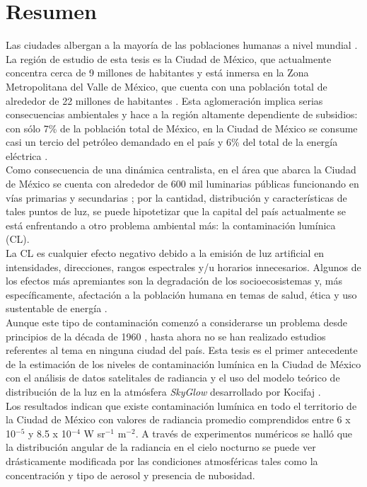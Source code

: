 \chapter{Resumen}

Las ciudades albergan a la mayoría de las poblaciones humanas a nivel mundial \citep{Zari2018}. La región de estudio de esta tesis es la Ciudad de México, que actualmente concentra cerca de 9 millones de habitantes \citep{INEGI2015} y está inmersa en la Zona Metropolitana del Valle de México, que cuenta con una población total de alrededor de 22 millones de habitantes \citep{OCDE2015}. Esta aglomeración implica serias consecuencias ambientales y hace a la región altamente dependiente de subsidios: con sólo 7\% de la población total de México, en la Ciudad de México se consume casi un tercio del petróleo demandado en el país y 6\% del total de la energía eléctrica \citep{SENER2013}.\\

Como consecuencia de una dinámica centralista, en el área que abarca la Ciudad de México se cuenta con alrededor de 600 mil luminarias públicas funcionando en vías primarias y secundarias \citep{INFO2019}; por la cantidad, distribución y características de tales puntos de luz, se puede hipotetizar que la capital del país actualmente se está enfrentando a otro problema ambiental más: la contaminación lumínica (CL).\\

La CL es cualquier efecto negativo debido a la emisión de luz artificial en intensidades, direcciones, rangos espectrales y/u horarios innecesarios. Algunos de los efectos más apremiantes son la degradación de los socioecosistemas y, más específicamente, afectación a la población humana en temas de salud, ética y uso sustentable de energía \citep{AtlasREPSA, LibroCL, Stone2017}.\\

Aunque este tipo de contaminación comenzó a considerarse un problema desde principios de la década de 1960 \citep{LibroCL}, hasta ahora no se han realizado estudios referentes al tema en ninguna ciudad del país. Esta tesis es el primer antecedente de la estimación de los niveles de contaminación lumínica en la Ciudad de México con el análisis de datos satelitales de radiancia y el uso del modelo teórico de distribución de la luz en la atmósfera \textit{SkyGlow} desarrollado por Kocifaj \citep{Kocifaj2007}.\\

Los resultados indican que existe contaminación lumínica en todo el territorio de la Ciudad de México con valores de radiancia promedio comprendidos entre 6 x 10$^{-5}$ y 8.5 x 10$^{-4}$ W sr$^{-1}$ m$^{-2}$. A través de experimentos numéricos se halló que la distribución angular de la radiancia en el cielo nocturno se puede ver drásticamente modificada por las condiciones atmosféricas tales como la concentración y tipo de aerosol y presencia de nubosidad.\\

